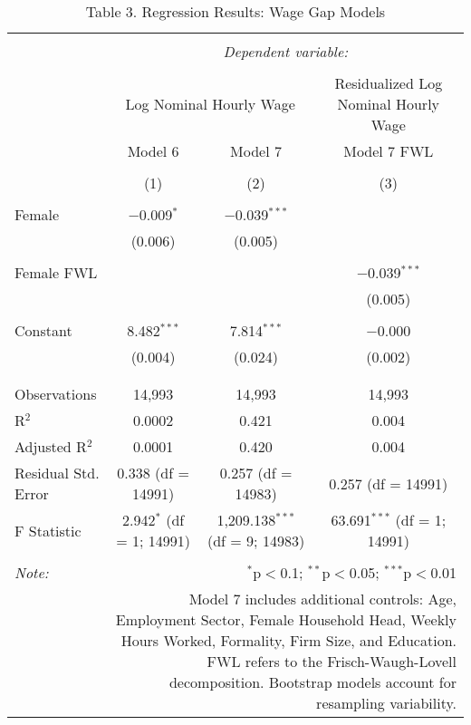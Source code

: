 
\begin{table}[!htbp] \centering 
  \caption{Table 3. Regression Results: Wage Gap Models} 
  \label{} 
\begin{tabular}{@{\extracolsep{5pt}}lccc} 
\\[-1.8ex]\hline 
\hline \\[-1.8ex] 
 & \multicolumn{3}{c}{\textit{Dependent variable:}} \\ 
\cline{2-4} 
\\[-1.8ex] & \multicolumn{2}{c}{Log Nominal Hourly Wage} & Residualized Log Nominal Hourly Wage \\ 
 & Model 6 & Model 7 & Model 7 FWL \\ 
\\[-1.8ex] & (1) & (2) & (3)\\ 
\hline \\[-1.8ex] 
 Female & $-$0.009$^{*}$ & $-$0.039$^{***}$ &  \\ 
  & (0.006) & (0.005) &  \\ 
  & & & \\ 
 Female FWL &  &  & $-$0.039$^{***}$ \\ 
  &  &  & (0.005) \\ 
  & & & \\ 
 Constant & 8.482$^{***}$ & 7.814$^{***}$ & $-$0.000 \\ 
  & (0.004) & (0.024) & (0.002) \\ 
  & & & \\ 
\hline \\[-1.8ex] 
Observations & 14,993 & 14,993 & 14,993 \\ 
R$^{2}$ & 0.0002 & 0.421 & 0.004 \\ 
Adjusted R$^{2}$ & 0.0001 & 0.420 & 0.004 \\ 
Residual Std. Error & 0.338 (df = 14991) & 0.257 (df = 14983) & 0.257 (df = 14991) \\ 
F Statistic & 2.942$^{*}$ (df = 1; 14991) & 1,209.138$^{***}$ (df = 9; 14983) & 63.691$^{***}$ (df = 1; 14991) \\ 
\hline 
\hline \\[-1.8ex] 
\textit{Note:}  & \multicolumn{3}{r}{$^{*}$p$<$0.1; $^{**}$p$<$0.05; $^{***}$p$<$0.01} \\ 
 & \multicolumn{3}{r}{Model 7 includes additional controls: Age, Employment Sector, Female Household Head, Weekly Hours Worked, Formality, Firm Size, and Education. FWL refers to the Frisch-Waugh-Lovell decomposition. Bootstrap models account for resampling variability.} \\ 
\end{tabular} 
\end{table} 
